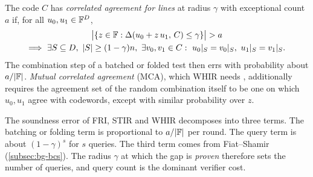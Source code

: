 \begin{definition}\label{def:bg-ca}
The code $C$ has \emph{correlated agreement for lines} at radius $\gamma$ with exceptional count
$a$ if, for all $u_0,u_1\in\mathbb{F}^D$,
\begin{multline*}
  \bigl|\{z\in\F : \Delta(u_0+z\,u_1,\,C)\le\gamma\}\bigr|> a \\
  \Longrightarrow\ \exists S\subseteq D,\ |S|\ge(1-\gamma)n,\ \exists v_0,v_1\in C:\
  u_0|_S=v_0|_S,\ u_1|_S=v_1|_S.
\end{multline*}
The combination step of a batched or folded test then errs with probability about $a/|\mathbb{F}|$.
\emph{Mutual correlated agreement} (MCA), which WHIR needs \cite{ACFY24-WHIR}, additionally
requires the agreement set of the random combination itself to be one on which $u_0,u_1$ agree
with codewords, except with similar probability over $z$.
\end{definition}

The soundness error of FRI, STIR and WHIR decomposes into three terms. The batching or folding term
is proportional to $a/|\mathbb{F}|$ per round. The query term is about $(1-\gamma)^s$ for $s$ queries. The
third term comes from Fiat--Shamir (\cref{subsec:bg-bcs}). The radius $\gamma$ at which the gap
is \emph{proven} therefore sets the number of queries, and query count is the dominant verifier
cost.

